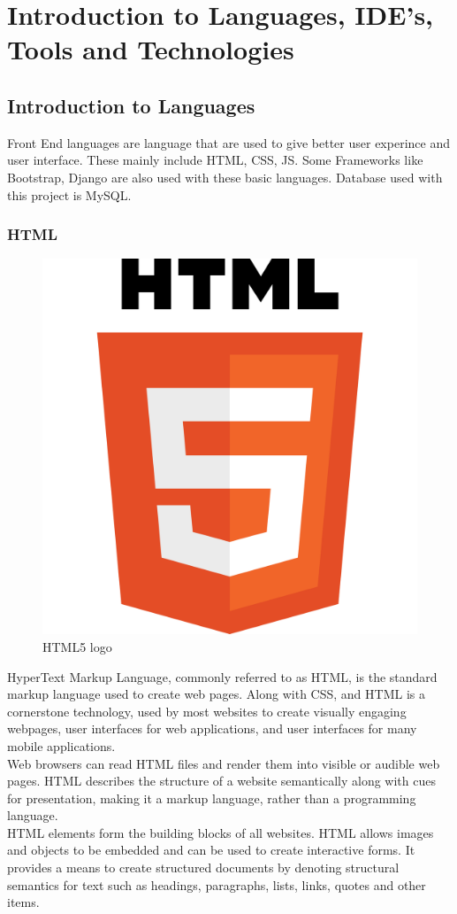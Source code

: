\section{Introduction to Languages, IDE's, Tools and Technologies}

\subsection{Introduction to Languages}
Front End languages are language that are used to give better user experince and user interface. These mainly include HTML, CSS, JS. Some Frameworks like Bootstrap, Django are also used with these basic languages. Database used with this project is MySQL.
\subsubsection{HTML}

\begin{figure}[h]
\centering \includegraphics[scale=0.05]{input/images/HTML.png}
\caption{HTML5 logo}
\end{figure}
HyperText Markup Language, commonly referred to as HTML, is the standard markup language used to create web pages. Along with CSS, and HTML is a cornerstone technology, used by most websites to create visually engaging webpages, user interfaces for web applications, and user interfaces for many mobile applications. \\
Web browsers can read HTML files and render them into visible or audible web pages. HTML describes the structure of a website semantically along with cues for presentation, making it a markup language, rather than a programming language.\\
HTML elements form the building blocks of all websites. HTML allows images and objects to be embedded and can be used to create interactive forms. It provides a means to create structured documents by denoting structural semantics for text such as headings, paragraphs, lists, links, quotes and other items.

